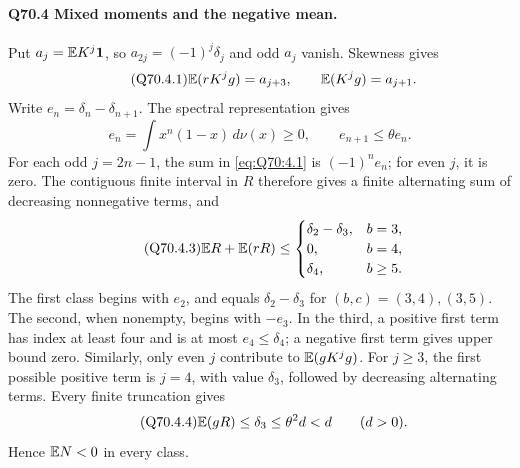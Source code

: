 \paragraph{Q70.4 Mixed moments and the negative mean.}
Put \(a_j=\allowbreak \mathbb E K^j\mathbf1\), so \(a_{2j}=\allowbreak (-1)^j\delta_j\) and
odd \(a_j\) vanish. Skewness gives
\begin{equation}\tag{Q70.4.1}\label{eq:Q70:4.1}
\mathbb E(rK^jg)=a_{j+3},\qquad\mathbb E(K^jg)=a_{j+1}.
\end{equation}
Write \(e_n=\allowbreak \delta_n-\delta_{n+1}\). The spectral representation gives
\begin{equation}\tag{Q70.4.2}\label{eq:Q70:4.2}
e_n=\int x^n(1-x)\,d\nu(x)\ge0,\qquad e_{n+1}\le\theta e_n.
\end{equation}
For each odd \(j=\allowbreak 2n-1\), the sum in \eqref{eq:Q70:4.1} is
\((-1)^ne_n\); for even \(j\), it is zero.
The contiguous finite interval in \(R\) therefore gives a finite
alternating sum of decreasing nonnegative terms, and
\begin{equation}\tag{Q70.4.3}\label{eq:Q70:4.3}
\mathbb E R+\mathbb E(rR)\le
\begin{cases}\delta_2-\delta_3,&b=3,\\0,&b=4,\\\delta_4,&b\ge5.\end{cases}
\end{equation}
The first class begins with \(e_2\), and equals
\(\delta_2-\delta_3\) for \((b,\allowbreak c)=\allowbreak (3,\allowbreak 4),\allowbreak (3,\allowbreak 5)\).
The second, when nonempty, begins with \(-e_3\).
In the third, a positive first term has index at least four and is
at most \(e_4\le\allowbreak \delta_4\); a negative first term gives upper bound zero.
Similarly, only even \(j\) contribute to \(\mathbb E(gK^jg)\). For \(j\ge\allowbreak 3\),
the first possible positive term is \(j=\allowbreak 4\), with value \(\delta_3\),
followed by decreasing alternating terms. Every finite truncation gives
\begin{equation}\tag{Q70.4.4}\label{eq:Q70:4.4}
\mathbb E(gR)\le\delta_3\le\theta^2d<d\qquad(d>0).
\end{equation}
Hence \(\mathbb E N<\allowbreak 0\) in every class.

